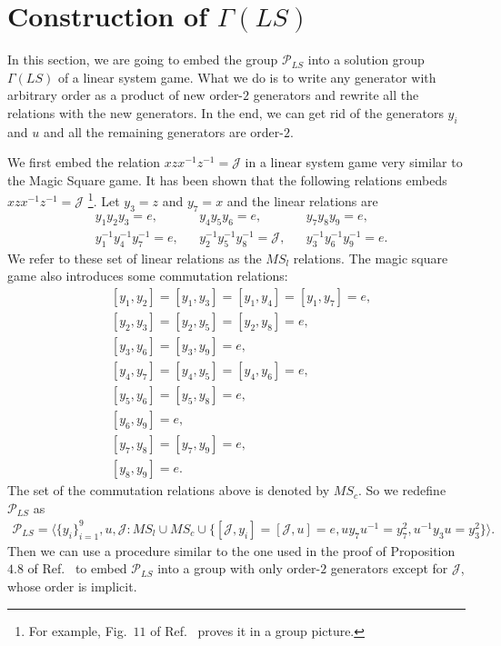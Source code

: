 \documentclass[11pt,letterpaper]{article}
\newcommand{\1}{\mathbb{1}}
\newcommand{\Pg}{\mathcal{P}}
\newcommand{\J}{\mathcal{J}}
\newcommand{\MS}{MS}
\newcommand{\LS}{LS}
\theoremstyle{definition}
\begin{document}
\section{Construction of $\Gamma(\LS)$}
\label{sec:construct}
In this section, we are going to embed the group $\Pg_{\LS}$ into a solution group $\Gamma(\LS)$ of a linear system game.
What we do is to write any generator with arbitrary order as a product of new order-$2$ generators and rewrite all
the relations with the new generators. In the end, we can get rid of the generators $y_i$ and $u$ and all 
the remaining generators are order-$2$.

We first embed the relation $xzx^{-1}z^{-1} = \J$ in a linear system game very similar to the Magic Square game.
It has been shown that the following relations embeds $xzx^{-1}z^{-1} = \J$ \footnote{For example, Fig.~$11$ of Ref.~\cite{coladan2017}
proves it in a group picture.}. Let $y_3 = z$ and $y_7 = x$ and the linear relations are 
\begin{align*}
	&y_1y_2y_3 = e,
	&&y_4y_5y_6 = e,
	&&y_7y_8y_9 = e,\\
	&y_1^{-1}y_4^{-1}y_7^{-1} = e,
	&&y_2^{-1}y_5^{-1}y_8^{-1} = \J,
	&&y_3^{-1}y_6^{-1}y_9^{-1} = e.
\end{align*}
We refer to these set of linear relations as the $\MS_l$ relations.
The magic square game also introduces some commutation relations:
\begin{align*}
	&[y_1, y_2] = [y_1, y_3] = [y_1, y_4] = [y_1,y_7] = e,\\
	&[y_2, y_3] = [y_2, y_5] = [y_2, y_8] = e,\\
	&[y_3, y_6] = [y_3, y_9] = e,\\
	&[y_4, y_7] = [y_4,y_5] =  [y_4,y_6] = e, \\
	& [y_5,y_6] =  [y_5,y_8] = e,\\
	& [y_6,y_9] = e,\\
	& [y_7,y_8] =  [y_7,y_9] = e,\\
	&[y_8,y_9] = e.
\end{align*}
The set of the commutation relations above is denoted by $\MS_c$.
So we redefine $\Pg_{\LS}$ as 
\begin{align}
	\Pg_{\LS} = \langle \{y_i\}_{i=1}^9,u,\J: \MS_l \cup \MS_c \cup \{ [\J, y_i] = [\J, u] = e,
					uy_7u^{-1} = y_7^2, u^{-1}y_3u = y_3^2\}	 \rangle.
\end{align}
Then we can use a procedure similar to the one used in the proof of Proposition~$4.8$ of Ref.~\cite{slofstra2017} to 
embed $\Pg_{\LS}$ into a group with only order-$2$ generators except for $\J$, whose order is implicit.
\end{document}
